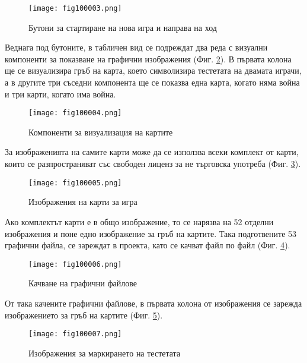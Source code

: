 \begin{figure}[H]
  \centering
  \texttt{[image: fig100003.png]}
  \caption{Бутони за стартиране на нова игра и направа на ход}
\label{fig100003}
\end{figure}

Веднага под бутоните, в табличен вид се подреждат два реда с визуални компоненти за показване на графични изображения (Фиг. \ref{fig100004}). В първата колона ще се визуализира гръб на карта, което символизира тестетата на двамата играчи, а в другите три съседни компонента ще се показва една карта, когато няма война и три карти, когато има война. 

\begin{figure}[H]
  \centering
  \texttt{[image: fig100004.png]}
  \caption{Компоненти за визуализация на картите}
\label{fig100004}
\end{figure}

За изображенията на самите карти може да се използва всеки комплект от карти, които се разпространяват със свободен лиценз за не търговска употреба (Фиг. \ref{fig100005}).

\begin{figure}[H]
  \centering
  \texttt{[image: fig100005.png]}
  \caption{Изображения на карти за игра}
\label{fig100005}
\end{figure}

Ако комплектът карти е в общо изображение, то се нарязва на 52 отделни изображения и поне едно изображение за гръб на картите. Така подготвените 53 графични файла, се зареждат в проекта, като се качват файл по файл (Фиг. \ref{fig100006}).

\begin{figure}[H]
  \centering
  \texttt{[image: fig100006.png]}
  \caption{Качване на графични файлове}
\label{fig100006}
\end{figure}

От така качените графични файлове, в първата колона от изображения се зарежда изображението за гръб на картите (Фиг. \ref{fig100007}).

\begin{figure}[H]
  \centering
  \texttt{[image: fig100007.png]}
  \caption{Изображения за маркирането на тестетата}
\label{fig100007}
\end{figure}

